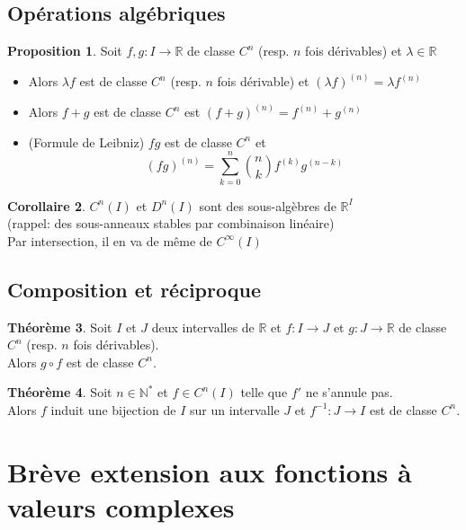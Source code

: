 \documentclass[10pt,a4paper]{article}
\theoremstyle{definition}
\newtheorem{proposition}{Proposition}[section]
\newtheorem{theorem}[proposition]{Théorème}
\newtheorem{corollaire}[proposition]{Corollaire}
\begin{document}
\subsection{Opérations algébriques}
\begin{proposition}
Soit $f, g: I \to \mathbb{R}$ de classe $C^n$ (resp. $n$ fois dérivables) et $\lambda \in \mathbb{R}$
\begin{itemize}
\item Alors $\lambda f$ est de classe $C^n$ (resp. $n$ fois dérivable) et $(\lambda f)^{(n)} = \lambda f^{(n)}$
\item Alors $f + g$ est de classe $C^n$ est $(f + g)^{(n)} = f^{(n)} + g^{(n)}$
\item (Formule de Leibniz) $fg$ est de classe $C^n$ et
\[(fg)^{(n)} = \sum\limits_{k = 0}^n \binom{n}{k} f^{(k)} g^{(n - k)}\]
\end{itemize}
\end{proposition}
\begin{corollaire}
$C^n(I)$ et $D^n(I)$ sont des sous-algèbres de $\mathbb{R}^I$ \\
(rappel: des sous-anneaux stables par combinaison linéaire) \\
Par intersection, il en va de même de $C^\infty(I)$
\end{corollaire}

\subsection{Composition et réciproque}
\begin{theorem}
Soit $I$ et $J$ deux intervalles de $\mathbb{R}$ et $f: I \to J$ et $g: J \to \mathbb{R}$ de classe $C^n$ (resp. $n$ fois dérivables). \\
Alors $g \circ f$ est de classe $C^n$.
\end{theorem}
\begin{theorem}
Soit $n \in \mathbb{N}^*$ et $f \in C^n(I)$ telle que $f'$ ne s'annule pas. \\
Alors $f$ induit une bijection de $I$ sur un intervalle $J$ et $f^{-1}: J \to I$ est de classe $C^n$.
\end{theorem}

\section{Brève extension aux fonctions à valeurs complexes}
\end{document}

